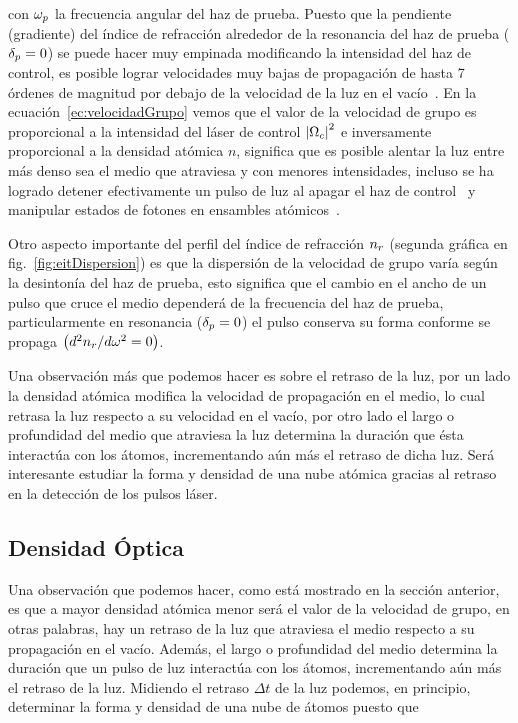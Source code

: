 con $\omega_{p}$ la frecuencia angular del haz de prueba. Puesto que la pendiente (gradiente) del índice de refracción alrededor de la resonancia del haz de prueba ($\delta_{p}=0$) se puede hacer muy empinada modificando la intensidad del haz de control, es posible lograr velocidades muy bajas de propagación de hasta 7 órdenes de magnitud por debajo de la velocidad de la luz en el vacío~\cite{hau}. En la ecuación~\ref{ec:velocidadGrupo} vemos que el valor de la velocidad de grupo es proporcional a la intensidad del láser de control $\left|\Omega_{c}\right|^{2}$ e inversamente proporcional a la densidad atómica $n$,  significa que es posible alentar la luz entre más denso sea el medio que atraviesa y con menores intensidades, incluso se ha logrado detener efectivamente un pulso de luz al apagar el haz de control~\cite{liu,phillips} y manipular estados de fotones en ensambles atómicos~\cite{lukin1}.

\p Otro aspecto importante del perfil del índice de refracción $n_{r}$ (segunda gráfica en fig.~\ref{fig:eitDispersion}) es que la dispersión de la velocidad de grupo varía según la desintonía del haz de prueba, esto significa que el cambio en el ancho de un pulso que cruce el medio dependerá de la frecuencia del haz de prueba, particularmente en resonancia ($\delta_{p}=0$) el pulso conserva su forma conforme se propaga $\bigl(d^{2}n_{r}/d\omega^{2}=0\bigr)$.

\p Una observación más que podemos hacer es sobre el retraso de la luz, por un lado la densidad atómica modifica la velocidad de propagación en el medio, lo cual retrasa la luz respecto a su velocidad en el vacío, por otro lado el largo o profundidad del medio que atraviesa la luz determina la duración que ésta interactúa con los átomos, incrementando aún más el retraso de dicha luz. Será interesante estudiar la forma y densidad de una nube atómica gracias al retraso en la detección de los pulsos láser.

\subsection{\label{sub:densidadOptica}Densidad Óptica}

Una observación que podemos hacer, como está mostrado en la sección anterior, es que a mayor densidad atómica menor será el valor de la velocidad de grupo, en otras palabras, hay un retraso de la luz que atraviesa el medio respecto a su propagación en el vacío. Además, el largo o profundidad del medio determina la duración que un pulso de luz interactúa con los átomos, incrementando aún más el retraso de la luz. Midiendo el retraso $\Delta t$ de la luz podemos, en principio, determinar la forma y densidad de una nube de átomos puesto que

